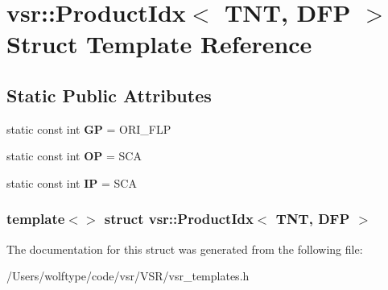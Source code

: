 \hypertarget{structvsr_1_1_product_idx_3_01_t_n_t_00_01_d_f_p_01_4}{\section{vsr\-:\-:Product\-Idx$<$ T\-N\-T, D\-F\-P $>$ Struct Template Reference}
\label{structvsr_1_1_product_idx_3_01_t_n_t_00_01_d_f_p_01_4}
}
\subsection*{Static Public Attributes}
\begin{DoxyCompactItemize}
\item 
\hypertarget{structvsr_1_1_product_idx_3_01_t_n_t_00_01_d_f_p_01_4_a15de5f6270713a8745eef6c4fc686ee6}{static const int {\bfseries G\-P} = O\-R\-I\-\_\-\-F\-L\-P}\label{structvsr_1_1_product_idx_3_01_t_n_t_00_01_d_f_p_01_4_a15de5f6270713a8745eef6c4fc686ee6}

\item 
\hypertarget{structvsr_1_1_product_idx_3_01_t_n_t_00_01_d_f_p_01_4_a56c50f4816a3daf3a46f11469235aff0}{static const int {\bfseries O\-P} = S\-C\-A}\label{structvsr_1_1_product_idx_3_01_t_n_t_00_01_d_f_p_01_4_a56c50f4816a3daf3a46f11469235aff0}

\item 
\hypertarget{structvsr_1_1_product_idx_3_01_t_n_t_00_01_d_f_p_01_4_a35bb0f3b2c1b9bd62417e3b975f6b75e}{static const int {\bfseries I\-P} = S\-C\-A}\label{structvsr_1_1_product_idx_3_01_t_n_t_00_01_d_f_p_01_4_a35bb0f3b2c1b9bd62417e3b975f6b75e}

\end{DoxyCompactItemize}
\subsubsection*{template$<$$>$ struct vsr\-::\-Product\-Idx$<$ T\-N\-T, D\-F\-P $>$}



The documentation for this struct was generated from the following file\-:\begin{DoxyCompactItemize}
\item 
/\-Users/wolftype/code/vsr/\-V\-S\-R/vsr\-\_\-templates.\-h\end{DoxyCompactItemize}
